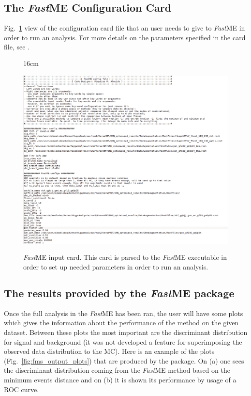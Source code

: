 \subsection{The \textit{Fast}ME Configuration Card \label{subsec:fme_config_card}}
Fig.~\ref{fig:fastme_input_card} view of the configuration card file that an user needs to give to \textit{Fast}ME in order to run an analysis. For more details on the parameters specified in the card file, see \cite{bib:fastme_package}.

\begin{figure}[h!]{16cm}
\caption{\textit{Fast}ME input card. This card is parsed to the \textit{Fast}ME executable in order to set up needed parameters in order to run an analysis.}
\includegraphics[angle=90,scale=0.67,trim={0cm 0cm 0cm 0cm},clip]{AppendixFastME/figs/fme_config_card}
\label{fig:fastme_input_card}
\end{figure}


\subsection{The results provided by the \textit{Fast}ME package}
Once the full analysis in the \textit{Fast}ME has been ran, the user will have some plots which gives the information about the performance of the method on the given dataset. Between these plots the most important are the discriminant distribution for signal and background (it was not developed a feature for superimposing the observed data distribution to the MC). Here is an example of the plots (Fig.~\ref{fig:fms_output_plots}) that are produced by the package. On (a) one sees the discriminant distribution coming from the \textit{Fast}ME method based on the minimum events distance and on (b) it is shown its performance by usage of a ROC curve.

